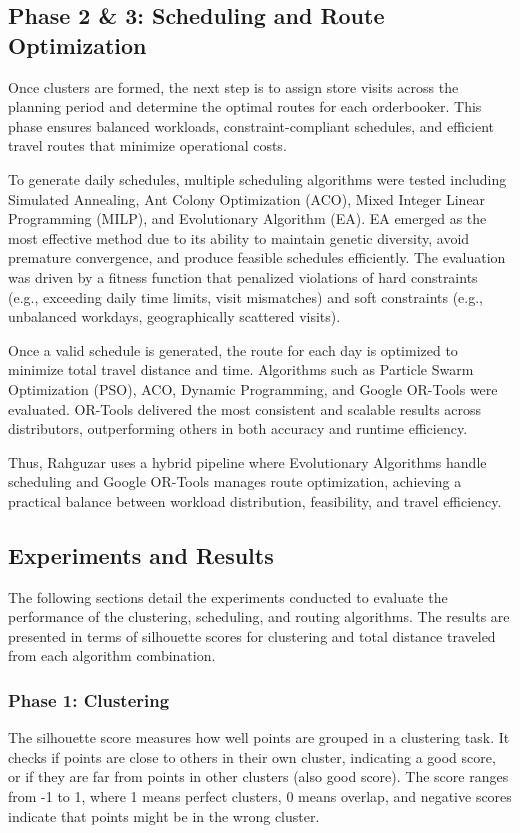 \subsection{Phase 2 \& 3: Scheduling and Route Optimization}
Once clusters are formed, the next step is to assign store visits across the planning period and determine the optimal routes for each orderbooker. This phase ensures balanced workloads, constraint-compliant schedules, and efficient travel routes that minimize operational costs.

To generate daily schedules, multiple scheduling algorithms were tested including Simulated Annealing, Ant Colony Optimization (ACO), Mixed Integer Linear Programming (MILP), and Evolutionary Algorithm (EA). EA emerged as the most effective method due to its ability to maintain genetic diversity, avoid premature convergence, and produce feasible schedules efficiently. The evaluation was driven by a fitness function that penalized violations of hard constraints (e.g., exceeding daily time limits, visit mismatches) and soft constraints (e.g., unbalanced workdays, geographically scattered visits).

Once a valid schedule is generated, the route for each day is optimized to minimize total travel distance and time. Algorithms such as Particle Swarm Optimization (PSO), ACO, Dynamic Programming, and Google OR-Tools were evaluated. OR-Tools delivered the most consistent and scalable results across distributors, outperforming others in both accuracy and runtime efficiency.

Thus, Rahguzar uses a hybrid pipeline where Evolutionary Algorithms handle scheduling and Google OR-Tools manages route optimization, achieving a practical balance between workload distribution, feasibility, and travel efficiency.

\subsection{Experiments and Results}
The following sections detail the experiments conducted to evaluate the performance of the clustering, scheduling, and routing algorithms. The results are presented in terms of silhouette scores for clustering and total distance traveled from each algorithm combination.
\subsubsection{Phase 1: Clustering}
The silhouette score measures how well points are grouped in a clustering task. It checks if points are close to others in their own cluster, indicating a good score, or if they are far from points in other clusters (also good score). The score ranges from -1 to 1, where 1 means perfect clusters, 0 means overlap, and negative scores indicate that points might be in the wrong cluster.

